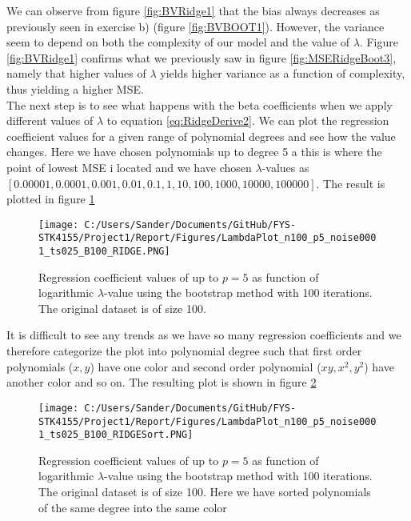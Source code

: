 \documentclass[12pt,a4paper]{article}
\begin{document}
\noindent We can observe from figure \ref{fig:BVRidge1} that the bias always decreases as previously seen in exercise b) (figure \ref{fig:BVBOOT1}). However, the variance seem to depend on both the complexity of our model and the value of $\lambda$. Figure \ref{fig:BVRidge1} confirms what we previously saw in figure \ref{fig:MSERidgeBoot3}, namely that higher values of $\lambda$ yields higher variance as a function of complexity, thus yielding a higher MSE.
\\
The next step is to see what happens with the beta coefficients when we apply different values of $\lambda$ to equation \ref{eq:RidgeDerive2}. We can plot the regression coefficient values for a given range of polynomial degrees and see how the value changes. Here we have chosen polynomials up to degree 5 a this is where the point of lowest MSE i located and we have chosen $\lambda$-values as $[0.00001, 0.0001, 0.001, 0.01, 0.1, 1, 10, 100, 1000, 10000, 100000]$. The result is plotted in figure \ref{fig:LambdaPlot1}

\begin{figure}[H]
\centering
\texttt{[image: C:/Users/Sander/Documents/GitHub/FYS-STK4155/Project1/Report/Figures/LambdaPlot\_n100\_p5\_noise0001\_ts025\_B100\_RIDGE.PNG]}
\caption{\label{fig:LambdaPlot1} Regression coefficient values of up to $p = 5$ as function of logarithmic $\lambda$-value using the bootstrap method with 100 iterations. The original dataset is of size 100.}
\end{figure}

\noindent It is difficult to see any trends as we have so many regression coefficients and we therefore categorize the plot into polynomial degree such that first order polynomials ($x,y$) have one color and second order polynomial ($xy,x^2,y^2$) have another color and so on. The resulting plot is shown in figure \ref{fig:LambdaPlot2}

\begin{figure}[H]
\centering
\texttt{[image: C:/Users/Sander/Documents/GitHub/FYS-STK4155/Project1/Report/Figures/LambdaPlot\_n100\_p5\_noise0001\_ts025\_B100\_RIDGESort.PNG]}
\caption{\label{fig:LambdaPlot2} Regression coefficient values of up to $p = 5$ as function of logarithmic $\lambda$-value using the bootstrap method with 100 iterations. The original dataset is of size 100. Here we have sorted polynomials of the same degree into the same color}
\end{figure}
\end{document}
